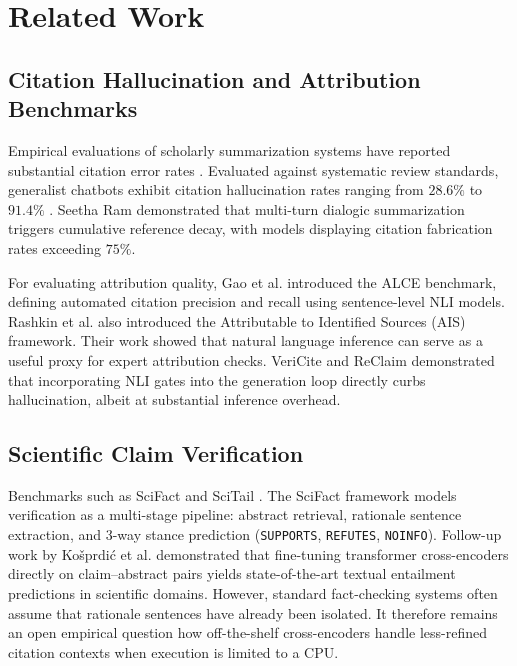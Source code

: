 \documentclass[11pt,a4paper]{article}
\begin{document}
\section{Related Work}
\label{sec:related}
\subsection{Citation Hallucination and Attribution Benchmarks}
Empirical evaluations of scholarly summarization systems have reported substantial citation error rates \cite{seetharam2025citation}. Evaluated against systematic review standards, generalist chatbots exhibit citation hallucination rates ranging from $28.6\%$ to $91.4\%$ \cite{agarwal2026citation}. Seetha Ram \cite{seetharam2025citation} demonstrated that multi-turn dialogic summarization triggers cumulative reference decay, with models displaying citation fabrication rates exceeding $75\%$. 

For evaluating attribution quality, Gao et al. \cite{gao2023enabling} introduced the ALCE benchmark, defining automated citation precision and recall using sentence-level NLI models. Rashkin et al. \cite{rashkin2023measuring} also introduced the Attributable to Identified Sources (AIS) framework. Their work showed that natural language inference can serve as a useful proxy for expert attribution checks. VeriCite \cite{zhu2025vericite} and ReClaim \cite{chen2024ground} demonstrated that incorporating NLI gates into the generation loop directly curbs hallucination, albeit at substantial inference overhead.

\subsection{Scientific Claim Verification}
Benchmarks such as SciFact \cite{wadden2020fact} and SciTail \cite{khot2018scitail}. The SciFact framework models verification as a multi-stage pipeline: abstract retrieval, rationale sentence extraction, and 3-way stance prediction (\texttt{SUPPORTS}, \texttt{REFUTES}, \texttt{NOINFO}). Follow-up work by Ko\v{s}prdi\'{c} et al. \cite{kosprdic2024scientific} demonstrated that fine-tuning transformer cross-encoders directly on claim--abstract pairs yields state-of-the-art textual entailment predictions in scientific domains. However, standard fact-checking systems often assume that rationale sentences have already been isolated. It therefore remains an open empirical question how off-the-shelf cross-encoders handle less-refined citation contexts when execution is limited to a CPU.
\end{document}
